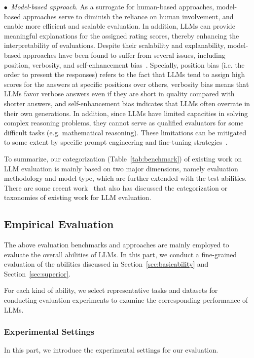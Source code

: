 {{$\bullet$~\emph{Model-based approach}. As a surrogate for human-based approaches, model-based approaches serve to diminish the reliance on human involvement, and enable more efficient and scalable evaluation. In addition, LLMs can provide meaningful explanations for the assigned rating scores, thereby enhancing the interpretability of evaluations. Despite their scalability and explanability, model-based approaches have been found to suffer from several issues, including position, verbosity, and self-enhancement bias~\cite{Zheng-2023-arxiv-Judging}. Specially, position bias (i.e. the order to present the responses) refers to the fact that LLMs tend to assign high scores for the answers at specific positions over others, verbosity bias means that LLMs favor verbose answers even if they are short in quality compared with shorter answers, and self-enhancement bias indicates that LLMs often overrate in their own generations. In addition, since LLMs have limited capacities in  solving complex reasoning problems, they cannot serve as qualified evaluators for some difficult tasks (e.g. mathematical reasoning). These limitations can be mitigated to some extent by specific prompt engineering and fine-tuning strategies~\cite{Zheng-2023-arxiv-Judging}.

To summarize, our categorization (Table~\ref{tab:benchmark}) of existing work on LLM evaluation is mainly based on two major dimensions, namely evaluation methodology and model type, which are further extended with the test abilities. There are some recent work~\cite{Chang-2023-arxiv-A,Zhuang-2023-arxiv-Through} that also has discussed the categorization or taxonomies of existing work for LLM evaluation.

\subsection{Empirical Evaluation}\label{sec-empirical}
The above evaluation benchmarks and approaches are mainly employed to evaluate the overall abilities of LLMs. In this part, we conduct a fine-grained evaluation of the abilities discussed in Section~\ref{sec:basicability} and Section~\ref{sec:superior}.

For each kind of ability, we select representative tasks and datasets for conducting evaluation experiments to examine the corresponding performance of LLMs. 

\subsubsection{Experimental Settings} In this part, we introduce the experimental settings for our evaluation.

}}
